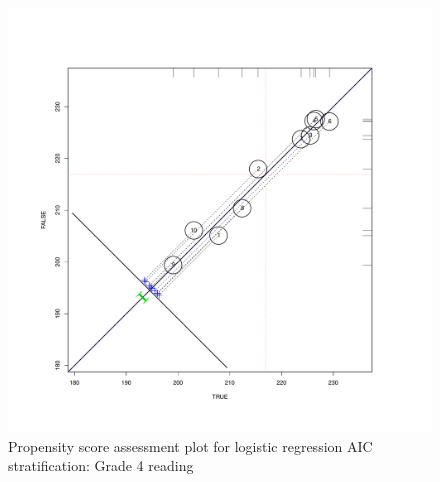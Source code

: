\clearpage
\begin{figure}
\begin{center}
\includegraphics[height=.4\textheight,width=.4\textheight]{../Figures2009/g4read-circpsa10-AIC.pdf}
\caption{Propensity score assessment plot for logistic regression AIC stratification: Grade 4 reading}
\end{center}
\end{figure}



